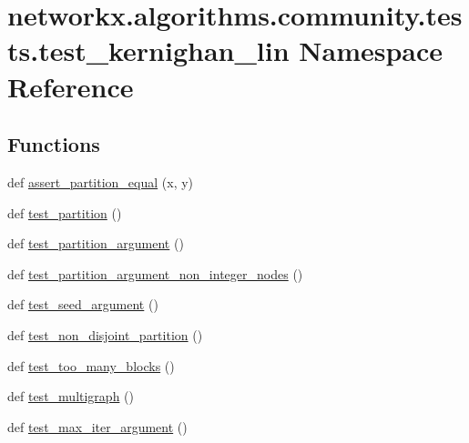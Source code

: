 \hypertarget{namespacenetworkx_1_1algorithms_1_1community_1_1tests_1_1test__kernighan__lin}{}\section{networkx.\+algorithms.\+community.\+tests.\+test\+\_\+kernighan\+\_\+lin Namespace Reference}
\label{namespacenetworkx_1_1algorithms_1_1community_1_1tests_1_1test__kernighan__lin}
\subsection*{Functions}
\begin{DoxyCompactItemize}
\item 
def \hyperlink{namespacenetworkx_1_1algorithms_1_1community_1_1tests_1_1test__kernighan__lin_afb2cbffc106a115b0f0ec8ee68e3c7ef}{assert\+\_\+partition\+\_\+equal} (x, y)
\item 
def \hyperlink{namespacenetworkx_1_1algorithms_1_1community_1_1tests_1_1test__kernighan__lin_a726e6293c5a29e8623b2030f69359de4}{test\+\_\+partition} ()
\item 
def \hyperlink{namespacenetworkx_1_1algorithms_1_1community_1_1tests_1_1test__kernighan__lin_a454dc972ab7f6bd60578995516cb043d}{test\+\_\+partition\+\_\+argument} ()
\item 
def \hyperlink{namespacenetworkx_1_1algorithms_1_1community_1_1tests_1_1test__kernighan__lin_ad1ca129cd2ba5f1bb967e9feacb52ff3}{test\+\_\+partition\+\_\+argument\+\_\+non\+\_\+integer\+\_\+nodes} ()
\item 
def \hyperlink{namespacenetworkx_1_1algorithms_1_1community_1_1tests_1_1test__kernighan__lin_a46569f209a762517dce4479675c730a9}{test\+\_\+seed\+\_\+argument} ()
\item 
def \hyperlink{namespacenetworkx_1_1algorithms_1_1community_1_1tests_1_1test__kernighan__lin_a9687b136536a222c84fae9a6d86b0708}{test\+\_\+non\+\_\+disjoint\+\_\+partition} ()
\item 
def \hyperlink{namespacenetworkx_1_1algorithms_1_1community_1_1tests_1_1test__kernighan__lin_acd4403e25a24556027f3ba1d4cde9d53}{test\+\_\+too\+\_\+many\+\_\+blocks} ()
\item 
def \hyperlink{namespacenetworkx_1_1algorithms_1_1community_1_1tests_1_1test__kernighan__lin_a86422808411900d4ec76cec090de4147}{test\+\_\+multigraph} ()
\item 
def \hyperlink{namespacenetworkx_1_1algorithms_1_1community_1_1tests_1_1test__kernighan__lin_a3ee605cc763270d9f45e0b998b7bdc63}{test\+\_\+max\+\_\+iter\+\_\+argument} ()
\end{DoxyCompactItemize}


